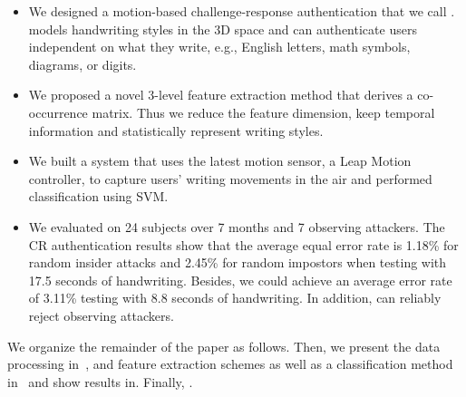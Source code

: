 \begin{itemize}
\vspace{-1.5mm}
\item We designed a motion-based challenge-response authentication that we call \CiT. \CiT models handwriting styles in the 3D space and can authenticate users independent on what they write, e.g., English letters, math symbols, diagrams, or digits. 

\item We proposed a novel 3-level feature extraction method that derives a co-occurrence matrix. Thus we reduce the feature dimension, keep temporal information and statistically represent writing styles. 

\item We built a system that uses the latest motion sensor, a Leap Motion controller, to capture users' writing movements in the air and performed classification using SVM. 


\item We evaluated \CiT on 24 subjects over 7 months and 7 observing attackers.
The CR authentication results show that the average equal error rate is 1.18\% for random insider attacks and 2.45\% for random impostors when testing with 17.5 seconds of handwriting. Besides, we could achieve an average error rate of 3.11\% testing with 8.8 seconds of handwriting. In addition, \CiT can reliably reject observing attackers.

\vspace{-1mm}
\end{itemize}

We organize the remainder of the paper as follows.  Then, we present the data processing in~, and feature extraction schemes as well as a classification method in~ and show results in. Finally, . 

